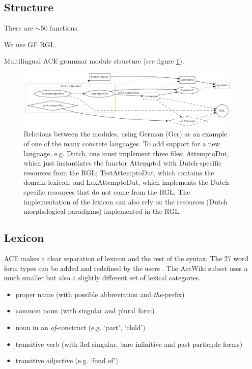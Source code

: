 \documentclass[a4paper]{article}
\begin{document}
\subsection{Structure}

There are $\sim$50 functions.

We use GF RGL.

Multilingual ACE grammar module structure (see figure \ref{fig:modules}).

\begin{figure}[ht]
\centering
\includegraphics[width=0.99\textwidth]{modules}
\caption[Relations between the ACE grammar modules]
{Relations between the modules, using German (Ger) as an example
of one of the many concrete languages. To add support for a new language,
e.g. Dutch, one must implement three files:
AttemptoDut, which just
instantiates the functor AttemptoI with Dutch-specific resources from the RGL;
TestAttemptoDut, which contains the domain lexicon; and
LexAttemptoDut, which implements the Dutch-specific resources that
do not come from the RGL. The implementation of the lexicon can also
rely on the resources (Dutch morphological paradigms) implemented
in the RGL.}
\label{fig:modules}
\end{figure}

\subsection{Lexicon}

ACE makes a clear separation of lexicon and the rest of the syntax.
The 27 word form types can be added and redefined by the users
\cite{ACE_6.6_Lexicon_Specification}. The AceWiki subset uses a much smaller
but also a slightly different set of lexical categories.

\begin{itemize}
\item proper name (with possible abbreviation and \emph{the}-prefix)
\item common noun (with singular and plural form)
\item noun in an \emph{of}-construct (e.g. `part', `child')
\item transitive verb (with 3rd singular, bare infinitive and past participle
forms)
\item transitive adjective (e.g. `fond of')
\end{itemize}
\end{document}
